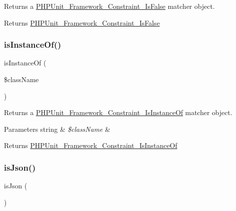 Returns a \mbox{\hyperlink{class_p_h_p_unit___framework___constraint___is_false}{P\+H\+P\+Unit\+\_\+\+Framework\+\_\+\+Constraint\+\_\+\+Is\+False}} matcher object.

\begin{DoxyReturn}{Returns}
\mbox{\hyperlink{class_p_h_p_unit___framework___constraint___is_false}{P\+H\+P\+Unit\+\_\+\+Framework\+\_\+\+Constraint\+\_\+\+Is\+False}} 
\end{DoxyReturn}
\mbox{\label{_functions_8php_af324645a2a21de618d667cabfa622dbd}} 
\subsubsection{\texorpdfstring{is\+Instance\+Of()}{isInstanceOf()}}
{\footnotesize\ttfamily is\+Instance\+Of (\begin{DoxyParamCaption}\item[{}]{\$class\+Name }\end{DoxyParamCaption})}

Returns a \mbox{\hyperlink{class_p_h_p_unit___framework___constraint___is_instance_of}{P\+H\+P\+Unit\+\_\+\+Framework\+\_\+\+Constraint\+\_\+\+Is\+Instance\+Of}} matcher object.


\begin{DoxyParams}[1]{Parameters}
string & {\em \$class\+Name} & \\
\hline
\end{DoxyParams}
\begin{DoxyReturn}{Returns}
\mbox{\hyperlink{class_p_h_p_unit___framework___constraint___is_instance_of}{P\+H\+P\+Unit\+\_\+\+Framework\+\_\+\+Constraint\+\_\+\+Is\+Instance\+Of}} 
\end{DoxyReturn}
\mbox{\label{_functions_8php_a7b5758aea973ef707d377b4eb0a29dee}} 
\subsubsection{\texorpdfstring{is\+Json()}{isJson()}}
{\footnotesize\ttfamily is\+Json (\begin{DoxyParamCaption}{ }\end{DoxyParamCaption})}


